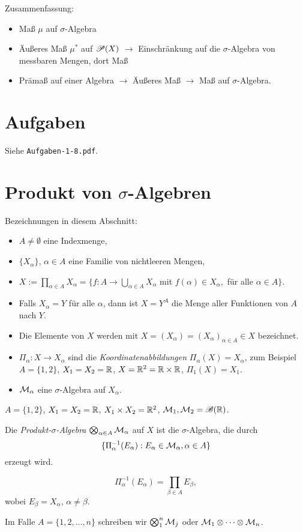 Zusammenfassung:
\begin{itemize}
 \item Maß $\mu$ auf $\sigma$-Algebra
 \item Äußeres Maß $\mu^*$ auf $\mathscr{P}(X)$ $\rightarrow$ Einschränkung auf die $\sigma$-Algebra von messbaren Mengen, dort Maß 
 \item Prämaß auf einer Algebra $\rightarrow$ Äußeres Maß $\rightarrow$ Maß auf $\sigma$-Algebra.
\end{itemize}

\section{Aufgaben}
Siehe \verb+Aufgaben-1-8.pdf+.

\section{Produkt von \texorpdfstring{$\sigma$}{Sigma}-Algebren}
Bezeichnungen in diesem Abschnitt:
\begin{itemize}
 \item $A \ne \emptyset$ eine Indexmenge,
 \item $\{ X_\alpha \}$, $\alpha \in A$ eine Familie von nichtleeren Mengen,
 \item $X := \prod_{\alpha \in A} X_\alpha = \{ f:A \to \bigcup_{\alpha \in A} X_\alpha$ mit $f( \alpha ) \in X_\alpha,$ für alle $\alpha \in A \}$.
 \item Falls $X_\alpha = Y$ für alle $\alpha$, dann ist $X = Y^A$ die Menge aller Funktionen von $A$ nach $Y$.
 \item Die Elemente von $X$ werden mit $X = (X_\alpha) = (X_\alpha)_{\alpha \in A} \in X$ bezeichnet.
 \item $\Pi_\alpha : X \to X_\alpha$ sind die \emph{Koordinatenabbildungen} $\Pi_\alpha(X) = X_\alpha$, zum Beispiel $A = \{ 1, 2 \}$, $X_1 = X_2 = \mathbb{R}$, $X = \mathbb{R}^2 = \mathbb{R} \times \mathbb{R}$, $\Pi_1(X) = X_1$.
 \item $\mathcal{M}_\alpha$ eine $\sigma$-Algebra auf $X_\alpha$.
\end{itemize}

\begin{exmp*}
 $A = \{ 1,2 \}$, $X_1 = X_2 = \mathbb{R}$, $X_1 \times X_2 = \mathbb{R}^2$, $\mathcal{M}_1, \mathcal{M}_2 = \mathscr{B}( \mathbb{R} )$.
\end{exmp*}

\begin{defn}
 Die \emph{Produkt-$\sigma$-Algebra} $\bigotimes_{\alpha \in A} \mathcal{M}_\alpha$ auf $X$ ist die $\sigma$-Algebra, die durch
 \[ \{ \Pi_\alpha^{-1}( E_\alpha ) : E_\alpha \in \mathcal{M}_\alpha, \alpha \in A \} \]
 erzeugt wird.

\[ \Pi_\alpha^{-1} ( E_\alpha ) = \prod_{\beta \in A} E_\beta, \]
wobei $E_\beta = X_\alpha$, $\alpha \ne \beta$.
 
Im Falle $A= \{ 1, 2, \ldots, n \}$ schreiben wir $\bigotimes_1^n \mathcal{M}_j$ oder $\mathcal{M}_1 \otimes \cdots \otimes \mathcal{M}_n$.
\end{defn}

